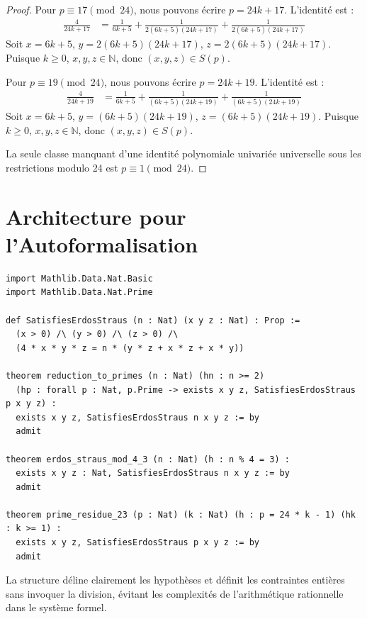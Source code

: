 \documentclass[12pt,a4paper]{article}
\begin{document}
\begin{proof}
Pour $p \equiv 17 \pmod{24}$, nous pouvons \'ecrire $p = 24k + 17$. L'identit\'e est :
\begin{align}
\frac{4}{24k+17} &= \frac{1}{6k+5} + \frac{1}{2(6k+5)(24k+17)} + \frac{1}{2(6k+5)(24k+17)}
\end{align}
Soit $x = 6k+5$, $y = 2(6k+5)(24k+17)$, $z = 2(6k+5)(24k+17)$. Puisque $k \ge 0$, $x,y,z \in \mathbb{N}$, donc $(x,y,z) \in S(p)$.

Pour $p \equiv 19 \pmod{24}$, nous pouvons \'ecrire $p = 24k + 19$. L'identit\'e est :
\begin{align}
\frac{4}{24k+19} &= \frac{1}{6k+5} + \frac{1}{(6k+5)(24k+19)} + \frac{1}{(6k+5)(24k+19)}
\end{align}
Soit $x = 6k+5$, $y = (6k+5)(24k+19)$, $z = (6k+5)(24k+19)$. Puisque $k \ge 0$, $x,y,z \in \mathbb{N}$, donc $(x,y,z) \in S(p)$.

La seule classe manquant d'une identit\'e polynomiale univari\'ee universelle sous les restrictions modulo 24 est $p \equiv 1 \pmod{24}$.
\end{proof}

\section{Architecture pour l'Autoformalisation}

\begin{lstlisting}[basicstyle=\ttfamily\small, breaklines=true]
import Mathlib.Data.Nat.Basic
import Mathlib.Data.Nat.Prime

def SatisfiesErdosStraus (n : Nat) (x y z : Nat) : Prop :=
  (x > 0) /\ (y > 0) /\ (z > 0) /\
  (4 * x * y * z = n * (y * z + x * z + x * y))

theorem reduction_to_primes (n : Nat) (hn : n >= 2)
  (hp : forall p : Nat, p.Prime -> exists x y z, SatisfiesErdosStraus p x y z) :
  exists x y z, SatisfiesErdosStraus n x y z := by
  admit

theorem erdos_straus_mod_4_3 (n : Nat) (h : n % 4 = 3) :
  exists x y z : Nat, SatisfiesErdosStraus n x y z := by
  admit

theorem prime_residue_23 (p : Nat) (k : Nat) (h : p = 24 * k - 1) (hk : k >= 1) :
  exists x y z, SatisfiesErdosStraus p x y z := by
  admit
\end{lstlisting}

La structure d\'eline clairement les hypoth\`eses et d\'efinit les contraintes enti\`eres sans invoquer la division, \'evitant les complexit\'es de l'arithm\'etique rationnelle dans le syst\`eme formel.
\end{document}
